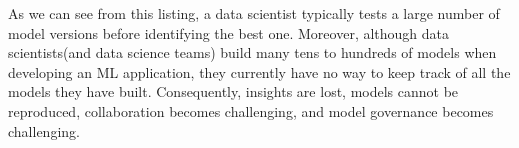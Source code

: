 \documentclass[11pt]{article}
\newcommand{\dss}{data scientists\xspace}
\newcommand{\ds}{data scientist\xspace}
\begin{document}











As we can see from this listing, a \ds typically tests a large number of model versions before identifying the best one.
Moreover, although \dss (and data science teams) build many tens to hundreds of models
when developing an ML application, they currently have no way to keep track of all 
the models they have built.
Consequently, insights are lost, models cannot be reproduced, collaboration becomes challenging, and model governance becomes challenging.
\end{document}
